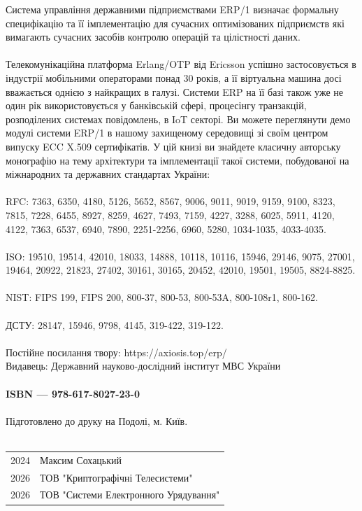 Система управління державними підприємствами ERP/1 визначає формальну
специфікацію та її імплементацію для сучасних оптимізованих підприємств
які вимагають сучасних засобів контролю операцій та цілістності даних.
\\
\\
Телекомунікаційна платформа Erlang/OTP від Ericsson успішно застосовується
в індустрії мобільними операторами понад 30 років, а її віртуальна машина
досі вважається однією з найкращих в галузі. Системи ERP на її базі також
уже не один рік використовується у банківській сфері, процесінгу транзакцій,
розподілених системах повідомлень, в IoT секторі. Ви можете переглянути демо
модулі системи ERP/1 в нашому захищеному середовищі зі своїм центром
випуску ECC X.509 сертифікатів. У цій книзі ви знайдете класичну авторську
монографію на тему архітектури та імплементації такої системи, побудованої
на міжнародних та державних стандартах України:
\\
\\
RFC: 7363, 6350, 4180, 5126, 5652,
     8567, 9006, 9011, 9019, 9159, 9100, 8323, 7815, 7228, 6455,
     8927, 8259, 4627, 7493, 7159, 4227, 3288, 6025, 5911, 4120, 4122, 7363, 6537, 6940, 7890,
     2251-2256, 6960, 5280, 1034-1035, 4033-4035.
\\
\\
ISO: 19510, 19514, 42010, 18033, 14888, 10118, 10116, 15946, 29146,
     9075, 27001,
     19464, 20922, 21823, 27402, 30161, 30165,
     20452, 42010, 19501, 19505,
     8824-8825.
\\
\\
NIST: FIPS 199, FIPS 200, 800-37, 800-53, 800-53A, 800-108r1, 800-162.
\\
\\
ДСТУ: 28147, 15946, 9798, 4145, 319-422, 319-122.
\\
\\
Постійне посилання твору: https://axiosis.top/erp/ \\
Видавець: Державний науково-дослідний інститут МВС України
\\
\\
{\bf ISBN --- 978-617-8027-23-0 \hspace{2em}}
\\
\\
Підготовлено до друку на Подолі, м. Київ.
\\
\\
\begin{tabular}{ll}
\textcopyright{} 2024 & Максим Сохацький \\
\textcopyright{} 2026 & ТОВ "Криптографічні Телесистеми" \\
\textcopyright{} 2026 & ТОВ "Системи Електронного Урядування"
\end{tabular}

\newpage
\cleartorecto
\tableofcontents*
\mainmatter
